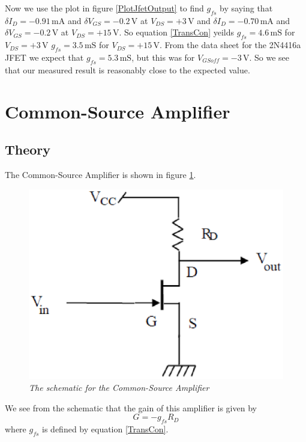 \documentclass[11pt]{article}
\numberwithin{equation}{section}
\numberwithin{figure}{section}
\numberwithin{table}{section}
\newcommand{\unit}[1]{\ensuremath{\, \mathrm{#1}}}
\begin{document}
Now we use the plot in figure \ref{PlotJfetOutput} to find $g_{fs}$ by saying that $\delta I_D=-0.91\unit{mA}$ and $\delta V_{GS} = -0.2\unit{V}$ at $V_{DS}=+3\unit{V}$ and $\delta I_D=-0.70\unit{mA}$ and $\delta V_{GS} = -0.2\unit{V}$ at $V_{DS}=+15\unit{V}$. So equation \ref{TransCon} yeilds $g_{fs} = 4.6\unit{mS}$ for $V_{DS}=+3\unit{V}$ $g_{fs} = 3.5\unit{mS}$ for $V_{DS} = +15\unit{V}$. From the data sheet for the 2N4416a JFET we expect that $g_{fs} = 5.3\unit{mS}$, but this was for $V_{GSoff}=-3\unit{V}$. So we see that our measured result is reasonably close to the expected value.

\section{Common-Source Amplifier}
\subsection{Theory}
The Common-Source Amplifier is shown in figure \ref{CSAmpSchem}. 
\begin{figure}[h]
\centering
\includegraphics[scale=0.50]{CSAmpSchem.eps}
\caption{\textit{The schematic for the Common-Source Amplifier}}
\label{CSAmpSchem}
\end{figure} 
We see from the schematic that the gain of this amplifier is given by
\begin{equation} 
G = -g_{fs}R_D
\label{Gain} 
\end{equation} 
where $g_{fs}$ is defined by equation \ref{TransCon}.
\end{document}
